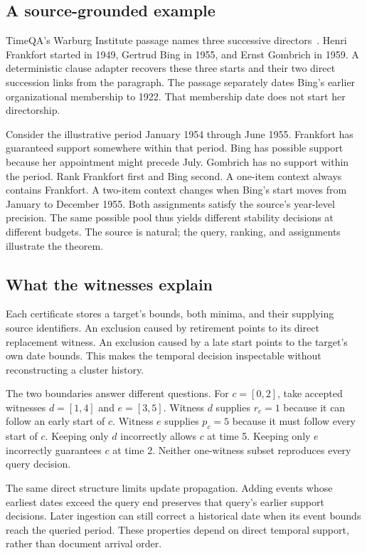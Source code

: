 \subsection{A source-grounded example}

TimeQA's Warburg Institute passage names three successive directors~\citep{chen2021timeqa}.
Henri Frankfort started in 1949, Gertrud Bing in 1955, and Ernst Gombrich in 1959.
A deterministic clause adapter recovers these three starts and their two direct succession links from the paragraph.
The passage separately dates Bing's earlier organizational membership to 1922.
That membership date does not start her directorship.

Consider the illustrative period January 1954 through June 1955.
Frankfort has guaranteed support somewhere within that period.
Bing has possible support because her appointment might precede July.
Gombrich has no support within the period.
Rank Frankfort first and Bing second.
A one-item context always contains Frankfort.
A two-item context changes when Bing's start moves from January to December 1955.
Both assignments satisfy the source's year-level precision.
The same possible pool thus yields different stability decisions at different budgets.
The source is natural; the query, ranking, and assignments illustrate the theorem.



\subsection{What the witnesses explain}

Each certificate stores a target's bounds, both minima, and their supplying source identifiers.
An exclusion caused by retirement points to its direct replacement witness.
An exclusion caused by a late start points to the target's own date bounds.
This makes the temporal decision inspectable without reconstructing a cluster history.

The two boundaries answer different questions.
For $c=[0,2]$, take accepted witnesses $d=[1,4]$ and $e=[3,5]$.
Witness $d$ supplies $r_c=1$ because it can follow an early start of $c$.
Witness $e$ supplies $p_c=5$ because it must follow every start of $c$.
Keeping only $d$ incorrectly allows $c$ at time 5.
Keeping only $e$ incorrectly guarantees $c$ at time 2.
Neither one-witness subset reproduces every query decision.

The same direct structure limits update propagation.
Adding events whose earliest dates exceed the query end preserves that query's earlier support decisions.
Later ingestion can still correct a historical date when its event bounds reach the queried period.
These properties depend on direct temporal support, rather than document arrival order.
